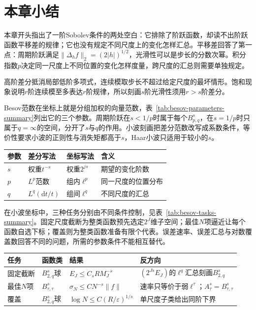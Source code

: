 \section{本章小结}
\label{sec:besov-summary}

本章开头指出了一阶Sobolev条件的两处空白：它排除了阶跃函数，却读不出阶跃函数平移差的规律；它也没有规定不同尺度上的变化怎样汇总。平移差回答了第一点：周期阶跃满足$\lVert\Delta_hf\rVert_2=(2\lvert h\rvert)^{1/2}$，光滑性可以是步长的分数次幂。积分指数$p$决定同一尺度上不同位置的变化怎样度量，跨尺度的汇总则需要单独规定。

高阶差分抵消局部低阶多项式，连续模取步长不超过给定尺度的最坏情形。饱和现象说明$r$阶连续模至多表达$r$阶规律，所以刻画$s$阶光滑性须用$r>s$阶差分。

Besov范数在坐标上就是分组加权的向量范数，表~\ref{tab:besov-parameters-summary}列出它的三个参数。周期阶跃在$s<1/p$时属于每个$B^s_{p,q}$，在$s=1/p$时只属于$q=\infty$的空间，分开了$s$与$q$的作用。小波刻画把差分范数改写成系数条件，等价性要求小波的正则性与消失矩都高于$s$，Haar小波只适用于较小的$s$。

\begin{BookInlineTable}
  \centering
  \begin{tabular}{@{}p{10mm}p{30mm}p{30mm}p{28mm}@{}}
    \toprule
    参数 & 差分写法 & 坐标写法 & 含义\\
    \midrule
    $s$ & 权重$t^{-s}$ & 权重$2^{js}$ & 期望的变化阶数\\
    $p$ & $L^p$范数 & 组内$\ell^p$ & 同一尺度的位置分布\\
    $q$ & $L^q(\mathrm dt/t)$ & 组间$\ell^q$ & 不同尺度的汇总\\
    \bottomrule
  \end{tabular}
  \caption{Besov范数三个参数的两种写法。}
  \label{tab:besov-parameters-summary}
\end{BookInlineTable}

在小波坐标中，三种任务分别由不同条件控制，见表~\ref{tab:besov-tasks-summary}。固定尺度截断为整类函数预先选定$2^J$维子空间；最佳$N$项逼近让每个函数自选下标；覆盖则为整类函数准备有限个代表。误差速率、误差汇总与对数覆盖数回答不同的问题，所需的参数条件不能相互替代。

\begin{BookInlineTable}
  \centering
  \begin{tabular}{@{}p{17mm}p{19mm}p{31mm}p{31mm}@{}}
    \toprule
    任务 & 函数类 & 结果 & 反方向\\
    \midrule
    固定截断 & $B^s_{2,q}$球 & $E_J\leq C_sRM_J^{-s}$ & $(2^{Js}E_J)$的$\ell^q$汇总刻画$B^s_{2,q}$\\
    最佳$N$项 & $B^s_{\tau,\tau}$ & $\sigma_N\leq CN^{-s}\lVert f\rVert$ & 速率只等价于弱$\ell^\tau$；$A^s_\tau=B^s_{\tau,\tau}$\\
    覆盖 & $B^s_{2,q}$球 & $\log N\leq C(R/\varepsilon)^{1/s}$ & 单尺度子类给出同阶下界\\
    \bottomrule
  \end{tabular}
  \caption{小波坐标中的三种任务。}
  \label{tab:besov-tasks-summary}
\end{BookInlineTable}

